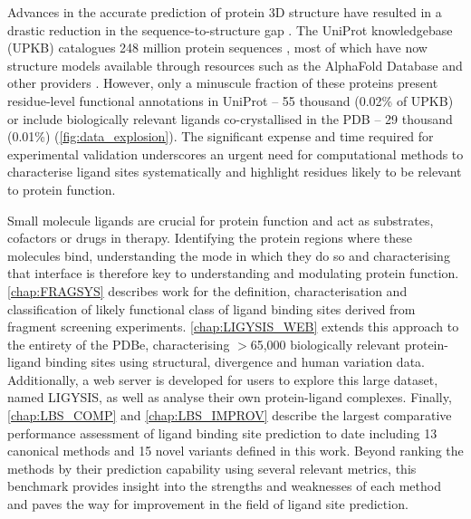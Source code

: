 Advances in the accurate prediction of protein 3D structure have resulted in a drastic reduction in the sequence-to-structure gap \cite{ABRAMSON_2024_ALPHAFOLD3}. The UniProt knowledgebase (UPKB) catalogues 248 million protein sequences \cite{UNIPROT_2018_UNIPROT, UNIPROT_2023_UNIPROT}, most of which have now structure models available through resources such as the AlphaFold Database \cite{VARADI_2022_ALPHAFOLDDB} and other providers \cite{GUEX_2009_SWISSMODEL, BEIENERT_2016_SWISSMODEL, WATERHOUSE_2018_SWISSMODEL}. However, only a minuscule fraction of these proteins present residue-level functional annotations in UniProt -- 55 thousand (0.02\% of UPKB) or include biologically relevant ligands co-crystallised in the PDB \cite{wwPDB_2019_PDB} -- 29 thousand (0.01\%) (\autoref{fig:data_explosion}). The significant expense and time required for experimental validation underscores an urgent need for computational methods to characterise ligand sites systematically and highlight residues likely to be relevant to protein function.

Small molecule ligands are crucial for protein function and act as substrates, cofactors or drugs in therapy. Identifying the protein regions where these molecules bind, understanding the mode in which they do so and characterising that interface is therefore key to understanding and modulating protein function. \autoref{chap:FRAGSYS} describes work for the definition, characterisation and classification of likely functional class of ligand binding sites derived from fragment screening experiments. \autoref{chap:LIGYSIS_WEB} extends this approach to the entirety of the PDBe, characterising $>$65,000 biologically relevant protein-ligand binding sites using structural, divergence and human variation data. Additionally, a web server is developed for users to explore this large dataset, named LIGYSIS, as well as analyse their own protein-ligand complexes. Finally, \autoref{chap:LBS_COMP} and \autoref{chap:LBS_IMPROV} describe the largest comparative performance assessment of ligand binding site prediction to date including 13 canonical methods and 15 novel variants defined in this work. Beyond ranking the methods by their prediction capability using several relevant metrics, this benchmark provides insight into the strengths and weaknesses of each method and paves the way for improvement in the field of ligand site prediction.

